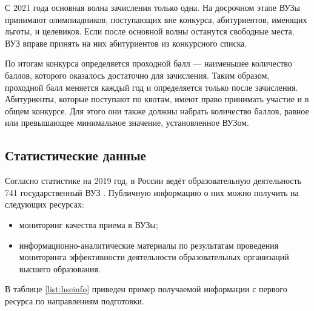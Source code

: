  С 2021 года основная волна зачисления только одна\cite{prikaz1}. На досрочном этапе ВУЗы принимают олимпиадников, поступающих вне конкурса, абитуриентов, имеющих льготы, и целевиков. Если после основной волны останутся свободные места, ВУЗ вправе принять на них абитуриентов из конкурсного списка.

По итогам конкурса определяется проходной балл — наименьшее количество баллов, которого оказалось достаточно для зачисления. Таким образом, проходной балл меняется каждый год и определяется только после зачисления. Абитуриенты, которые поступают по квотам, имеют право принимать участие и в общем конкурсе. Для этого они также должны набрать количество баллов, равное или превышающее минимальное значение, установленное ВУЗом.

\subsection{Статистические данные}

Согласно статистике на 2019 год, в России ведёт образовательную деятельность 741 государственный ВУЗ \cite{stat}. Публичную информацию о них можно получить на следующих ресурсах:

\begin{itemize}[leftmargin=1.6\parindent]
	\item мониторинг качества приема в ВУЗы\cite{hse};
	\item информационно-аналитические материалы по результатам проведения мониторинга
эффективности деятельности образовательных организаций высшего образования\cite{miccedu}.

\end{itemize}

В таблице \ref{list:hseinfo} приведен пример получаемой информации с первого ресурса по направлениям подготовки.

